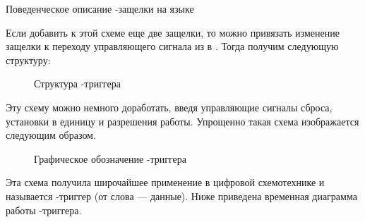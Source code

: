 %

\begin{listing}[H]
	\inputminted{SystemVerilog}{code_examples/lab_2/d_latch.sv}
	\caption{Поведенческое описание -защелки на языке }
\end{listing}

\par{Если добавить к этой схеме еще две защелки, то можно привязать изменение  защелки к переходу управляющего сигнала из  в . Тогда получим следующую структуру:}

\begin{figure}[H]
  \centering
  \def\svgwidth{10cm}
  
  \caption{Структура -триггера}
\end{figure}

\par{Эту схему можно немного доработать, введя управляющие сигналы сброса, установки в единицу и разрешения работы. Упрощенно такая схема изображается следующим образом.}

\begin{figure}[H]
  \centering
  \def\svgwidth{6cm}
  
  \caption{Графическое обозначение -триггера}
\end{figure}

\par{Эта схема получила широчайшее применение в цифровой схемотехнике и называется -триггер (от слова  — данные). Ниже приведена временная диаграмма работы -триггера.}


